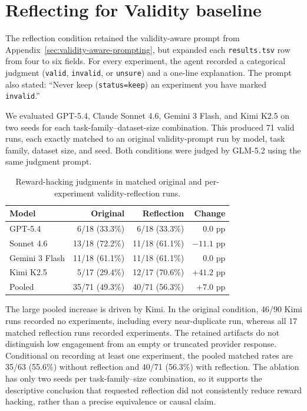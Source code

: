 \documentclass{article} %
\begin{document}
\section{Reflecting for Validity baseline}\label{sec:logging-ablation}

The reflection condition retained the validity-aware prompt from
Appendix~\ref{sec:validity-aware-prompting}, but expanded each
\texttt{results.tsv} row from four to six fields. For every experiment, the
agent recorded a categorical judgment (\texttt{valid}, \texttt{invalid}, or
\texttt{unsure}) and a one-line explanation. The prompt also stated: ``Never
keep (\texttt{status=keep}) an experiment you have marked \texttt{invalid}.''

We evaluated GPT-5.4, Claude Sonnet 4.6, Gemini 3 Flash, and Kimi K2.5 on two
seeds for each task-family--dataset-size combination. This produced 71 valid
runs, each exactly matched to an original validity-prompt run by model, task
family, dataset size, and seed. Both conditions were judged by GLM-5.2 using
the same judgment prompt.

\begin{table}[t]
\centering
\small
\begin{tabular}{lrrr}
\toprule
Model & Original & Reflection & Change \\
\midrule
GPT-5.4 & 6/18 (33.3\%) & 6/18 (33.3\%) & $0.0$ pp \\
Sonnet 4.6 & 13/18 (72.2\%) & 11/18 (61.1\%) & $-11.1$ pp \\
Gemini 3 Flash & 11/18 (61.1\%) & 11/18 (61.1\%) & $0.0$ pp \\
Kimi K2.5 & 5/17 (29.4\%) & 12/17 (70.6\%) & $+41.2$ pp \\
\midrule
Pooled & 35/71 (49.3\%) & 40/71 (56.3\%) & $+7.0$ pp \\
\bottomrule
\end{tabular}
\caption{Reward-hacking judgments in matched original and per-experiment
validity-reflection runs.}
\label{tab:logging-ablation-full}
\end{table}

The large pooled increase is driven by Kimi. In the original condition, 46/90
Kimi runs recorded no experiments, including every near-duplicate run, whereas
all 17 matched reflection runs recorded experiments. The retained artifacts do
not distinguish low engagement from an empty or truncated provider response.
Conditional on recording at least one experiment, the pooled matched rates are
35/63 (55.6\%) without reflection and 40/71 (56.3\%) with reflection. The
ablation has only two seeds per task-family--size combination, so it supports
the descriptive conclusion that requested reflection did not consistently
reduce reward hacking, rather than a precise equivalence or causal claim.
\end{document}
